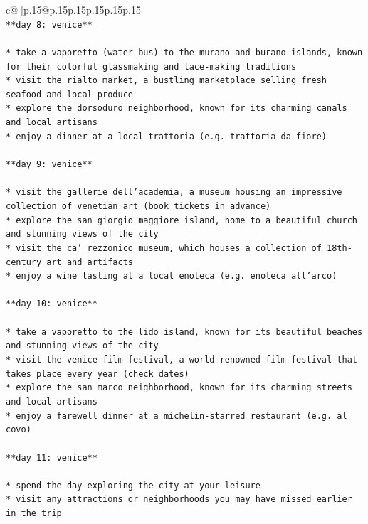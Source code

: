 \documentclass{article}
\begin{document}
{\begin{supertabular}{c@{$\;$}|p{.15\linewidth}@{}p{.15\linewidth}p{.15\linewidth}p{.15\linewidth}p{.15\linewidth}p{.15\linewidth}}
{{{\\ 
\texttt{**day 8: venice**} \\
\\ 
\texttt{* take a vaporetto (water bus) to the murano and burano islands, known for their colorful glassmaking and lace{-}making traditions} \\
\texttt{* visit the rialto market, a bustling marketplace selling fresh seafood and local produce} \\
\texttt{* explore the dorsoduro neighborhood, known for its charming canals and local artisans} \\
\texttt{* enjoy a dinner at a local trattoria (e.g. trattoria da fiore)} \\
\\ 
\texttt{**day 9: venice**} \\
\\ 
\texttt{* visit the gallerie dell'academia, a museum housing an impressive collection of venetian art (book tickets in advance)} \\
\texttt{* explore the san giorgio maggiore island, home to a beautiful church and stunning views of the city} \\
\texttt{* visit the ca' rezzonico museum, which houses a collection of 18th{-}century art and artifacts} \\
\texttt{* enjoy a wine tasting at a local enoteca (e.g. enoteca all'arco)} \\
\\ 
\texttt{**day 10: venice**} \\
\\ 
\texttt{* take a vaporetto to the lido island, known for its beautiful beaches and stunning views of the city} \\
\texttt{* visit the venice film festival, a world{-}renowned film festival that takes place every year (check dates)} \\
\texttt{* explore the san marco neighborhood, known for its charming streets and local artisans} \\
\texttt{* enjoy a farewell dinner at a michelin{-}starred restaurant (e.g. al covo)} \\
\\ 
\texttt{**day 11: venice**} \\
\\ 
\texttt{* spend the day exploring the city at your leisure} \\
\texttt{* visit any attractions or neighborhoods you may have missed earlier in the trip} \\
}}}
\end{supertabular}}
\end{document}
